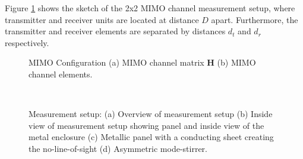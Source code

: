 \documentclass[10pt, final, journal, letterpaper, oneside, twocolumn]{IEEEtran}
\begin{document}
Figure \ref{fig:mimo_c2c_sketch} shows the sketch of the 2x2 MIMO channel measurement setup, where transmitter and receiver units are located at distance $D$ apart. Furthermore, the transmitter and receiver elements are separated by distances $d_t$ and $d_r$ respectively.

\begin{figure}
\centering
{}
\caption{MIMO Configuration (a) MIMO channel matrix $\mathbf{H}$ (b) MIMO channel elements.}
\label{fig:mimo_c2c_sketch}
\end{figure}
\begin{figure}
    \centering
{}
\hfill
{}\\
\hfill
{}
\caption{Measurement setup: (a) Overview of measurement setup (b) Inside view of measurement setup showing panel and inside view of the metal enclosure (c) Metallic panel with a conducting sheet creating the no-line-of-sight (d) Asymmetric mode-stirrer.}
\label{fig:meas_setup}
\end{figure}
\end{document}
